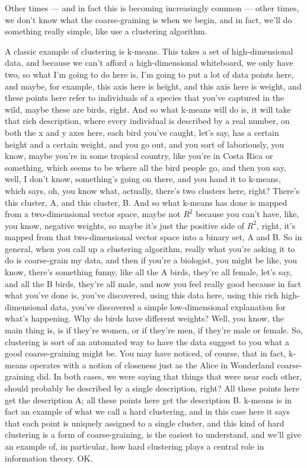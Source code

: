 \documentclass[]{article}
\begin{document}
Other times ---
and in fact this is becoming
increasingly common ---
other times, we don't know what
the coarse-graining is when we begin,
and in fact, we'll do something
really simple, like use
a clustering algorithm.

A classic example of clustering is k-means.
This takes a set of high-dimensional data, and because we can't afford
a high-dimensional whiteboard, we only have two,
so what I'm going to do here is,
I'm going to put a lot of
data points here, and maybe, for example,
this axis here is height,
and this axis here is weight, 
and these points here refer
to individuals of a species
that you've captured in the wild,
maybe these are birds, right.
And so what k-means will do is,
it will take that rich description,
where every individual is
described by a real number, 
on both the x and y axes here,
each bird you've caught, let's say,
has a certain height and a certain weight,
and you go out, and you sort of
laboriously, you know,
maybe you're in some tropical country,
like you're in Costa Rica or something,
which seems to be where
all the bird people go, 
and then you say, well, I don't know,
something's going on there,
and you hand it to k-means, which says,
oh, you know what, actually,
there's two clusters here, right?
There's this cluster, A,
and this cluster, B. And so
what k-means has done is
mapped from a two-dimensional
vector space, maybe not $R^2$
because you can't have, like, you know,
negative weights, so maybe it's just
the positive side of $R^2$, right,
it's mapped from that two-dimensional
vector space into a binary set, A and B.
So in general, when you call up
a clustering algorithm,
really what you're asking it to do
is coarse-grain my data, 
and then if you're a biologist,
you might be like, you know,
there's something funny, like
all the A birds, they're all female,
let's say, and all the B birds, 
they're all male, 
and now you feel really good
because in fact what you've done is,
you've discovered, using this data
here, using this rich high-dimensional
data, you've discovered a simple
low-dimensional explanation
for what's happening.
Why do birds have different weights?
Well, you know, the main thing is,
is if they're women, or if they're men,
if they're male or female.
So, clustering is sort of an automated way
to have the data suggest to you
what a good coarse-graining might be.
You may have noticed, of course, that
in fact, k-means operates with a notion
of closeness just as the
Alice in Wonderland coarse-graining did.
In both cases, we were saying that
things that were near each other, 
should probably be described by
a single description, right?
All these points here get
the description A; all these points here
get the description B.
k-means is in fact an example of
what we call a hard clustering, 
and in this case here it says that
each point is uniquely assigned
to a single cluster, and this kind of
hard clustering is a form of
coarse-graining, is the easiest to
understand, and we'll give an example of,
in particular, how hard clustering plays
a central role in information theory. OK.
\end{document}
